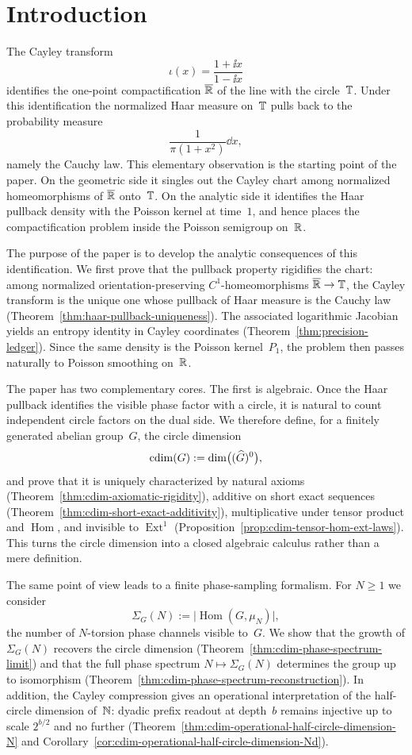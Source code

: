 \section{Introduction}\label{sec:introduction}

The Cayley transform
\[
\iota(x)=\frac{1+\ii x}{1-\ii x}
\]
identifies the one-point compactification $\overline{\mathbb{R}}$ of the line with
the circle~$\mathbb{T}$.  Under this identification the normalized Haar measure
on~$\mathbb{T}$ pulls back to the probability measure
\[
\frac{1}{\pi(1+x^{2})}\dd x,
\]
namely the Cauchy law.  This elementary observation is the starting point
of the paper.  On the geometric side it singles out the Cayley chart among
normalized homeomorphisms of $\overline{\mathbb{R}}$ onto~$\mathbb{T}$.  On the analytic
side it identifies the Haar pullback density with the Poisson kernel at
time~$1$, and hence places the compactification problem inside the
Poisson semigroup on~$\mathbb{R}$.

The purpose of the paper is to develop the analytic consequences of this
identification.  We first prove that the pullback property rigidifies the
chart: among normalized orientation-preserving
$C^{1}$-homeomorphisms $\overline{\mathbb{R}}\to\mathbb{T}$, the Cayley transform is the
unique one whose pullback of Haar measure is the Cauchy law
(Theorem~\ref{thm:haar-pullback-uniqueness}).  The associated logarithmic
Jacobian yields an entropy identity in Cayley coordinates
(Theorem~\ref{thm:precision-ledger}).  Since the same density is the
Poisson kernel~$P_1$, the problem then passes naturally to Poisson
smoothing on~$\mathbb{R}$.

The paper has two complementary cores.  The first is algebraic.  Once the
Haar pullback identifies the visible phase factor with a circle, it is
natural to count independent circle factors on the dual side.  We
therefore define, for a finitely generated abelian group~$G$, the circle
dimension
\[
\operatorname{cdim}(G):=\dim\bigl((\widehat G)^0\bigr),
\]
and prove that it is uniquely characterized by natural axioms
(Theorem~\ref{thm:cdim-axiomatic-rigidity}), additive on short exact
sequences (Theorem~\ref{thm:cdim-short-exact-additivity}), multiplicative
under tensor product and $\operatorname{Hom}$, and invisible to
$\operatorname{Ext}^{1}$ (Proposition~\ref{prop:cdim-tensor-hom-ext-laws}).
This turns the circle dimension into a closed algebraic calculus rather
than a mere definition.

The same point of view leads to a finite phase-sampling formalism.  For
$N\ge 1$ we consider
\[
\Sigma_G(N):=\bigl|\operatorname{Hom}(G,\mu_N)\bigr|,
\]
the number of $N$-torsion phase channels visible to~$G$.  We show that
the growth of $\Sigma_G(N)$ recovers the circle dimension
(Theorem~\ref{thm:cdim-phase-spectrum-limit}) and that the full phase
spectrum $N\mapsto \Sigma_G(N)$ determines the group up to isomorphism
(Theorem~\ref{thm:cdim-phase-spectrum-reconstruction}).  In addition, the
Cayley compression gives an operational interpretation of the half-circle
dimension of~$\mathbb{N}$: dyadic prefix readout at depth~$b$ remains injective up
to scale $2^{b/2}$ and no further
(Theorem~\ref{thm:cdim-operational-half-circle-dimension-N} and
Corollary~\ref{cor:cdim-operational-half-circle-dimension-Nd}).

